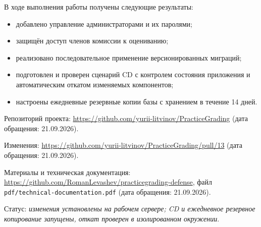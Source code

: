 \documentclass[a4paper]{article}
\begin{document}
В ходе выполнения работы получены следующие результаты:

\begin{itemize}
    \setlength{\itemsep}{0pt}
    \setlength{\parskip}{0pt}
    \setlength{\parsep}{0pt}
    \item добавлено управление администраторами и их паролями;
    \item защищён доступ членов комиссии к оцениванию;
    \item реализовано последовательное применение версионированных миграций;
    \item подготовлен и проверен сценарий CD с контролем состояния приложения
    и автоматическим откатом изменяемых компонентов;
    \item настроены ежедневные резервные копии базы с хранением в течение 14 дней.
\end{itemize}

Репозиторий проекта: \url{https://github.com/yurii-litvinov/PracticeGrading}
(дата обращения: 21.09.2026).

Изменения: \url{https://github.com/yurii-litvinov/PracticeGrading/pull/13}
(дата обращения: 21.09.2026).

Материалы и техническая документация:
\url{https://github.com/RomanLevashev/practicegrading-defense}, файл
\texttt{pdf/technical-documentation.pdf}
(дата обращения: 21.09.2026).

Статус: \emph{изменения установлены на рабочем сервере; CD и ежедневное
резервное копирование запущены, откат проверен в изолированном окружении}.
\end{document}
